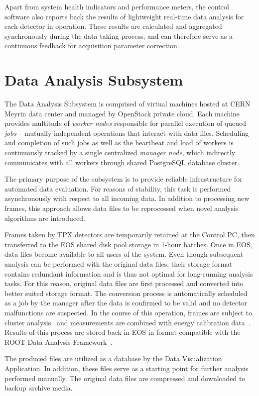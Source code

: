 \documentclass[journal]{IEEEtran}
\begin{document}
Apart from system health indicators and performance meters, the control software also reports back the results of lightweight real-time data analysis for each detector in operation. These results are calculated and aggregated synchronously during the data taking process, and can therefore serve as a continuous feedback for acquisition parameter correction.


\section{\label{sec:analysis}Data Analysis Subsystem}
The Data Analysis Subsystem is comprised of virtual machines hosted at CERN Meyrin data center and managed by OpenStack private cloud. Each machine provides multitude of \textit{worker nodes} responsible for parallel execution of queued \textit{jobs} -- mutually independent operations that interact with data files. Scheduling and completion of such jobs as well as the heartbeat and load of workers is continuously tracked by a single centralized \textit{manager node}, which indirectly communicates with all workers through shared PostgreSQL database cluster.

The primary purpose of the subsystem is to provide reliable infrastructure for automated data evaluation. For reasons of stability, this task is performed asynchronously with respect to all incoming data. In addition to processing new frames, this approach allows data files to be reprocessed when novel analysis algorithms are introduced.

Frames taken by TPX detectors are temporarily retained at the Control PC, then transferred to the EOS shared disk pool storage in 1-hour batches. Once in EOS, data files become available to all users of the system. Even though subsequent analysis can be performed with the original data files, their storage format contains redundant information and is thus not optimal for long-running analysis tasks. For this reason, original data files are first processed and converted into better suited storage format. The conversion process is automatically scheduled as a job by the manager after the data is confirmed to be valid and no detector malfunctions are suspected. In the course of this operation, frames are subject to cluster analysis~\cite{Holy2008} and measurements are combined with energy calibration data~\cite{Jakubek2011}. Results of this process are stored back in EOS in format compatible with the ROOT Data Analysis Framework~\cite{ROOT}.

The produced files are utilized as a database by the Data Visualization Application. In addition, these files serve as a starting point for further analysis performed manually. The original data files are compressed and downloaded to backup archive media.
\end{document}
